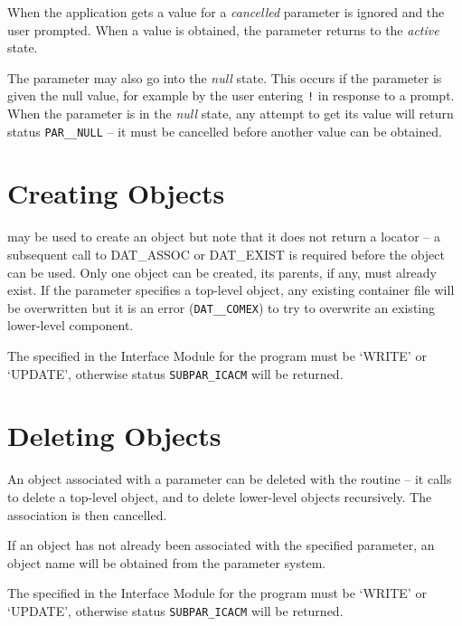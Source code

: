 \documentclass[twoside,11pt,nolof]{starlink}
\begin{document}
When the application gets a value for a \textit{ cancelled\/} parameter
is ignored and the user prompted. When a value is obtained, the parameter
returns to the \textit{ active\/} state.

The parameter may also go into the \textit{null\/} state. This occurs if the
parameter is given the null value, for example by the user entering \texttt{!}
in response to a prompt. When the parameter is in the \textit{null\/} state,
any attempt to get its value will return status \texttt{PAR\_\_NULL} -- it
must be cancelled before another value can be obtained.


\section{Creating Objects}
 may be used to create an object but
note that it does not return a locator -- a subsequent call to DAT\_ASSOC
or DAT\_EXIST is required before the object can be used.
Only one object can be created, its parents, if any, must already exist.
If the parameter specifies a top-level object, any existing container file will
be overwritten but it is an error (\texttt{DAT\_\_COMEX}) to try to overwrite
an existing lower-level component.

The
specified in the Interface Module for the program must be `WRITE' or `UPDATE',
otherwise status \texttt{SUBPAR\_ICACM} will be returned.

\section{Deleting Objects}
An object associated with a parameter can be deleted with the
routine -- it calls
to delete a top-level object, and
to delete lower-level objects recursively.
The association is then cancelled.

If an object has not already been associated with the specified parameter,
an object name will be obtained from the parameter system.

The
specified in the Interface Module for the program must be `WRITE' or `UPDATE',
otherwise status \texttt{SUBPAR\_ICACM} will be returned.
\end{document}
